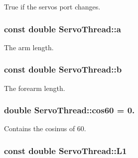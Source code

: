 True if the servos port changes. 

\hypertarget{class_servo_thread_a7dc3998d380d61406fe4485f9872edff}{}
\subsubsection[{a}]{\setlength{\rightskip}{0pt plus 5cm}const double Servo\+Thread\+::a\hspace{0.3cm}{\ttfamily [private]}}\label{class_servo_thread_a7dc3998d380d61406fe4485f9872edff}


The arm length. 

\hypertarget{class_servo_thread_a14f03febaa39a60b9bf7ff9b9151060c}{}
\subsubsection[{b}]{\setlength{\rightskip}{0pt plus 5cm}const double Servo\+Thread\+::b\hspace{0.3cm}{\ttfamily [private]}}\label{class_servo_thread_a14f03febaa39a60b9bf7ff9b9151060c}


The forearm length. 

\hypertarget{class_servo_thread_a5254b08335f14de98d18aed01abc6f58}{}
\subsubsection[{cos60}]{\setlength{\rightskip}{0pt plus 5cm}double Servo\+Thread\+::cos60 = 0.\hspace{0.3cm}{\ttfamily [private]}}\label{class_servo_thread_a5254b08335f14de98d18aed01abc6f58}


Contains the cosinus of 60. 

\hypertarget{class_servo_thread_a6281142e50115dd8c914c14cfae6f90d}{}
\subsubsection[{L1}]{\setlength{\rightskip}{0pt plus 5cm}const double Servo\+Thread\+::\+L1\hspace{0.3cm}{\ttfamily [private]}}\label{class_servo_thread_a6281142e50115dd8c914c14cfae6f90d}


